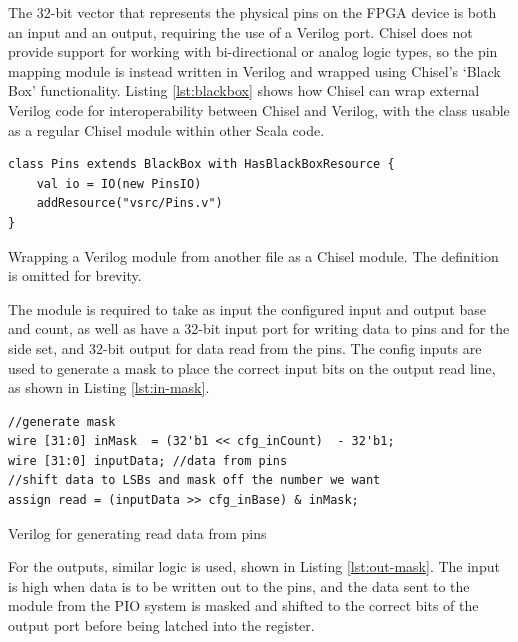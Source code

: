 The 32-bit vector that represents the physical pins on the FPGA device is both an input and an output, requiring the use of a Verilog  port. Chisel does not provide support for working with bi-directional or analog logic types, so the pin mapping module is instead written in Verilog and wrapped using Chisel's `Black Box' functionality. Listing \ref{lst:blackbox} shows how Chisel can wrap external Verilog code for interoperability between Chisel and Verilog, with the  class usable as a regular Chisel module within other Scala code.

\begin{listing}[h!]
    \centering
    \vspace{0.5cm}
    \begin{verbatim}
class Pins extends BlackBox with HasBlackBoxResource {
    val io = IO(new PinsIO)
    addResource("vsrc/Pins.v")
}
    \end{verbatim}
    \caption{Wrapping a Verilog module from another file as a Chisel module. The  definition is omitted for brevity.}
    \label{lst:blackbox}
\end{listing}

The module is required to take as input the configured input and output base and count, as well as have a 32-bit input port for writing data to pins and for the side set, and 32-bit output for data read from the pins. The config inputs are used to generate a mask to place the correct input bits on the output read line, as shown in Listing \ref{lst:in-mask}.

\begin{listing}[h!]
    \vspace{0.5cm}
    \begin{verbatim}
//generate mask
wire [31:0] inMask  = (32'b1 << cfg_inCount)  - 32'b1; 
wire [31:0] inputData; //data from pins
//shift data to LSBs and mask off the number we want
assign read = (inputData >> cfg_inBase) & inMask; 
    \end{verbatim}
    \caption{Verilog for generating read data from pins}
    \label{lst:in-mask}
\end{listing}

For the outputs, similar logic is used, shown in Listing \ref{lst:out-mask}. The  input is high when data is to be written out to the pins, and the data sent to the module from the PIO system is masked and shifted to the correct bits of the output port before being latched into the register.

